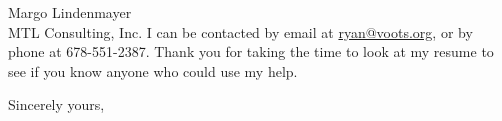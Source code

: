 \documentclass[11pt]{letter} %
\newcommand{\comment}[1]{} %
\begin{document}
\begin{letter}{
Margo Lindenmayer \\
MTL Consulting, Inc.}
I can be contacted by email at \href{mailto:ryan@voots.org}{ryan@voots.org}, or by phone at 678-551-2387.
Thank you for taking the time to look at my resume to see if you know anyone who could use my help.
\comment{\noindent PARAGRAPH THREE: Request a personal interview and  indicate  your
flexibility as to the time and place. Repeat your phone number in 
the letter and offer assistance to help in a speedy response. For 
example,  state that you will be in the city where the company is 
located on a certain date and would like to set up an  interview. 
Or,  state  that  you  will  call  on a certain date to set up an 
interview. End the letter by thanking  the  employer  for  taking 
time to consider your credentials. }
 
\closing{Sincerely yours,}

\end{letter}
 
\end{document}
